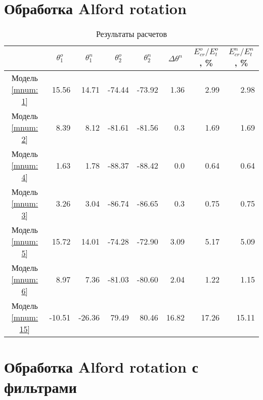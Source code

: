 \documentclass[a4paper,11pt]{article}
\begin{document}
\section{Обработка Alford rotation}

\begin{table}[h]
\footnotesize
\centering
\caption{Результаты расчетов}
\renewcommand{\arraystretch}{1.5}
\begin{tabularx}{\textwidth}{C|rr|rr|r|rr}
				& &  &  &  & &  &  \\ \hline
\hline Модель \ref{mnum: 1} & 15.56 & 14.71 &  -74.44 & -73.92  & 1.36  & 2.99 & 2.98 \\
 	   Модель \ref{mnum: 2} & 8.39 & 8.12 & -81.61 & -81.56 & 0.3 & 1.69 & 1.69 \\
 	   Модель \ref{mnum: 4} & 1.63 & 1.78 & -88.37  & -88.42  & 0.0  & 0.64 & 0.64 \\	   
	   Модель \ref{mnum: 3} & 3.26 & 3.04 & -86.74  & -86.65  & 0.3 & 0.75 & 0.75 \\ 	 
	   Модель \ref{mnum: 5} & 15.72 & 14.01 & -74.28  & -72.90  & 3.09 & 5.17 & 5.09 \\ 	
	   Модель \ref{mnum: 6} & 8.97 & 7.36 & -81.03  & -80.60  & 2.04 & 1.22 & 1.15 \\
	   Модель \ref{mnum: 15} & -10.51 & -26.36 & 79.49  & 80.46  & 16.82 & 17.26 & 15.11 \\
 	   \hline
\end{tabularx} 
\label{tab:std_process_results}
\renewcommand{\arraystretch}{1.0}
\end{table}

\section{Обработка Alford rotation с фильтрами}
\end{document}
